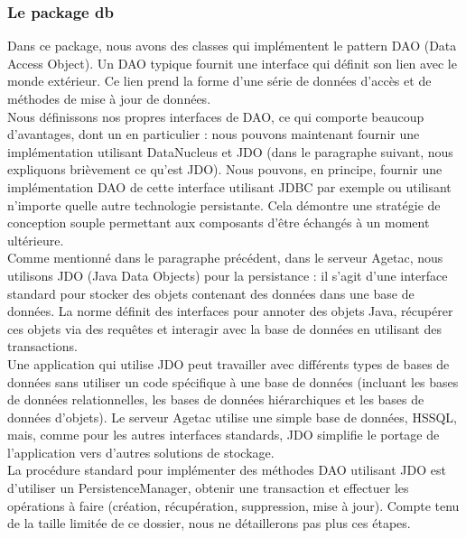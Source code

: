 \documentclass{article}
\begin{document}
\subsubsection{Le package db}

Dans ce package, nous avons des classes qui implémentent le pattern DAO (Data Access Object). Un DAO typique fournit une interface qui définit son lien avec le monde extérieur. Ce lien prend la forme d’une série de données d’accès et de méthodes de mise à jour de données.\\


Nous définissons nos propres interfaces de DAO, ce qui comporte beaucoup d’avantages, dont un en particulier : nous pouvons maintenant fournir une implémentation utilisant DataNucleus et JDO (dans le paragraphe suivant, nous expliquons brièvement ce qu’est JDO). Nous pouvons, en principe, fournir une implémentation DAO de cette interface utilisant JDBC par exemple ou utilisant n’importe quelle autre technologie persistante. Cela démontre une stratégie de conception souple permettant aux composants d’être échangés à un moment ultérieure.\\


Comme mentionné dans le paragraphe précédent, dans le serveur Agetac, nous utilisons JDO (Java Data Objects) pour la persistance : il s’agit d’une interface standard pour stocker des objets contenant des données dans une base de données. La norme définit des interfaces pour annoter des objets Java, récupérer ces objets via des requêtes et interagir avec la base de données en utilisant des transactions.\\


Une application qui utilise JDO peut travailler avec différents types de bases de données sans utiliser un code spécifique à une base de données (incluant les bases de données relationnelles, les bases de données hiérarchiques et les bases de données d’objets). Le serveur Agetac utilise une simple base de données, HSSQL, mais, comme pour les autres interfaces standards, JDO simplifie le portage de l’application vers d’autres solutions de stockage.\\


La procédure standard pour implémenter des méthodes DAO utilisant JDO est d’utiliser un PersistenceManager, obtenir une transaction et effectuer les opérations à faire (création, récupération, suppression, mise à jour). Compte tenu de la taille limitée de ce dossier, nous ne détaillerons pas plus ces étapes.\\
\end{document}

